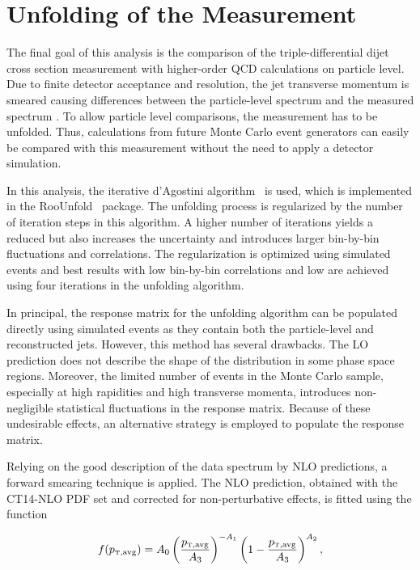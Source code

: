 \section{Unfolding of the Measurement}
\label{sec:unfolding}

The final goal of this analysis is the comparison of the triple-differential
dijet cross section measurement with higher-order QCD calculations on
particle level. Due to finite detector acceptance and resolution, the jet
transverse momentum is smeared causing differences between the particle-level
\ptavggen spectrum and the measured spectrum \ptavgreco. To allow particle level comparisons,
the measurement has to be unfolded. Thus, calculations from future Monte Carlo
event generators can easily be compared with this measurement without the need to
apply a detector simulation.

In this analysis, the iterative d'Agostini algorithm~\cite{DAgostini:1994zf} is
used, which is implemented in the RooUnfold~\cite{Adye:2011gm} package. The
unfolding process is regularized by the number of iteration steps in this
algorithm. A higher number of iterations yields a reduced \chisq but also
increases the uncertainty and introduces larger bin-by-bin fluctuations and
correlations. The regularization is optimized using simulated events and best
results with low bin-by-bin correlations and low \chisq are achieved using
four iterations in the unfolding algorithm.

In principal, the response matrix for the unfolding algorithm can be populated
directly using simulated events as they contain both the particle-level and
reconstructed jets. However, this method has several drawbacks. The LO
prediction does not describe the shape of the distribution in some phase space
regions. Moreover, the
limited number of events in the Monte Carlo sample, especially at high
rapidities and high transverse momenta, introduces non-negligible statistical
fluctuations in the response matrix. Because of these undesirable effects, an
alternative strategy is employed to populate the response matrix.

Relying on the good description of the data spectrum by NLO predictions, a forward
smearing technique is applied. The NLO prediction, obtained with the CT14-NLO PDF
set and corrected for non-perturbative effects, is fitted using the function

\begin{equation}
    f(\ptavg) = A_0 \left(
    \frac{\ptavg}{A_3}\right)^{-A_1}\left(1-\frac{\ptavg}{A_3}\right)^{A_2},
\end{equation}

